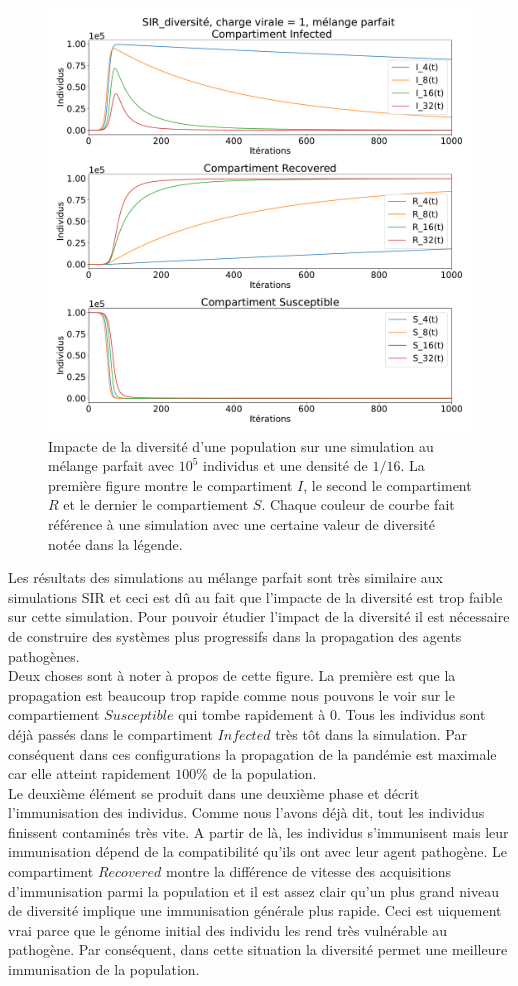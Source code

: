 \begin{figure}[h]
	\centering
	\captionsetup{justification=centering}
	\includegraphics[width=.8\textwidth]{Images/SIR_diversite_mix.pdf}
	\caption[Impacte de la diversité]{Impacte de la diversité d'une population sur une simulation au mélange parfait avec $10^5$ individus et une densité de $1/16$. La première figure montre le compartiment $I$, le second le compartiment $R$ et le dernier le compartiement $S$. Chaque couleur de courbe fait référence à une simulation avec une certaine valeur de diversité notée dans la légende.}
\end{figure}

Les résultats des simulations au mélange parfait sont très similaire aux simulations SIR et ceci est dû au fait que l'impacte de la diversité est trop faible sur cette simulation. Pour pouvoir étudier l'impact de la diversité il est nécessaire de construire des systèmes plus progressifs dans la propagation des agents pathogènes.\\

Deux choses sont à noter à propos de cette figure. La première est que la propagation est beaucoup trop rapide comme nous pouvons le voir sur le compartiement $Susceptible$ qui tombe rapidement à $0$. Tous les individus sont déjà passés dans le compartiment $Infected$ très tôt dans la simulation. Par conséquent dans ces configurations la propagation de la pandémie est maximale car elle atteint rapidement $100\%$ de la population.\\

Le deuxième élément se produit dans une deuxième phase et décrit l'immunisation des individus. Comme nous l'avons déjà dit, tout les individus finissent contaminés très vite. A partir de là, les individus s'immunisent mais leur immunisation dépend de la compatibilité qu'ils ont avec leur agent pathogène. Le compartiment $Recovered$ montre la différence de vitesse des acquisitions d'immunisation parmi la population et il est assez clair qu'un plus grand niveau de diversité implique une immunisation générale plus rapide. Ceci est uiquement vrai parce que le génome initial des individu les rend très vulnérable au pathogène. Par conséquent, dans cette situation la diversité permet une meilleure immunisation de la population.

